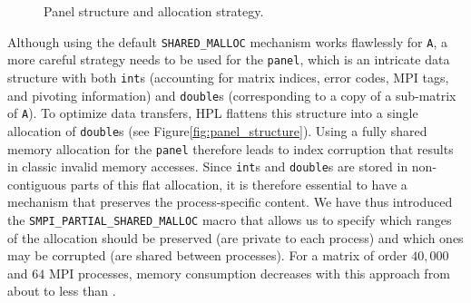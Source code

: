 \begin{figure}[t]
{\begin{minipage}{1.0\linewidth}
{\begin{minipage}[b]{\linewidth}
                \end{minipage}%
            }%
            \end{minipage}}%
            \caption{Panel structure and allocation strategy.\label{fig:panel}}\vspace{-1em}
        \end{figure}

        Although using the default \texttt{SHARED\_MALLOC} mechanism works flawlessly for \texttt{A}, a more careful
        strategy needs to be used for the \texttt{panel}, which is an intricate data structure with both \texttt{int}s
        (accounting for matrix indices, error codes, MPI tags, and pivoting information) and \texttt{double}s
        (corresponding to a copy of a sub-matrix of \texttt{A}). To optimize data transfers, HPL flattens this structure
        into a single allocation of \texttt{double}s (see Figure\ref{fig:panel_structure}). Using a fully shared memory
        allocation for the \texttt{panel} therefore leads to index corruption that results in classic invalid memory
        accesses. Since \texttt{int}s and \texttt{double}s are stored in non-contiguous parts of this flat allocation,
        it is therefore essential to have a mechanism that preserves the process-specific content. We have thus
        introduced the \texttt{SMPI\_PARTIAL\_SHARED\_MALLOC} macro that allows us to specify which ranges of the
        allocation should be preserved (\ie are private to each process) and which ones may be corrupted (\ie are shared
        between processes).  For a matrix of order \(40,000\) and \(64\) MPI processes, memory consumption decreases
        with this approach from about  to less than .

